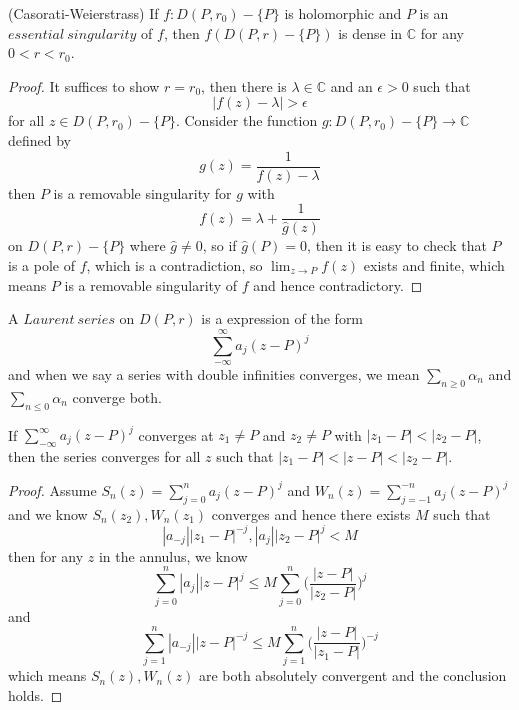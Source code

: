\documentclass[lang=en, color=blue, ]{elegantbook}
\newcommand{\C}{\mathbb{C}}
\begin{document}
\begin{theorem}
    (Casorati-Weierstrass) If  $f:D(P,r_0)-\{P\}$ is holomorphic and $P$ is an $essential\ singularity$ of $f$, then $f(D(P,r)-\{P\})$ is dense in $\C$ for any $0<r<r_0$.
\end{theorem}
\begin{proof}\par
    It suffices to show $r=r_0$, then there is $\lambda \in \C$ and an $\epsilon > 0$ such that
    \[|f(z)-\lambda|>\epsilon\]
    for all $z\in D(P,r_0)-\{P\}$. Consider the function $g:D(P,r_0)-\{P\}\to \C$ defined by
    \[
    g(z) = \dfrac{1}{f(z)-\lambda}
    \]
    then $P$ is a removable singularity for $g$ with
    \[
    f(z) = \lambda + \dfrac{1}{\hat{g}(z)}
    \]
    on $D(P,r)-\{P\}$ where $\hat{g} \neq 0$, so if $\hat{g}(P) = 0$, then it is easy to check that $P$ is a pole of $f$, which is a contradiction, so $\lim_{z\to P}f(z)$ exists and finite, which means $P$ is a removable singularity of $f$ and hence contradictory.
\end{proof}

\begin{definition}
    A $Laurent\ series$ on $D(P,r)$ is a expression of the form
    \[
    \sum\limits_{-\infty}^{\infty}a_j (z-P)^j
    \]
    and when we say a series with double infinities converges, we mean $\sum_{n\geq 0}\alpha_n$ and $\sum_{n\leq 0}\alpha_n$ converge both.
\end{definition}

\begin{lemma}
    If $\sum\limits_{-\infty}^{\infty} a_j(z-P)^j$ converges at $z_1 \neq P$ and $z_2\neq P$ with $|z_1 - P| < |z_2 - P|$, then the series converges for all $z$ such that $|z_1 - P| < |z-P|<|z_2-P|$.
\end{lemma}
\begin{proof}\par
    Assume $S_n(z) = \sum\limits_{j=0}^n a_j(z-P)^j$ and $W_n(z) = \sum\limits_{j=-1}^{-n} a_j(z-P)^j$ and we know $S_n(z_2),W_n(z_1)$ converges and hence there exists $M$ such that
    \[
    |a_{-j}||z_1-P|^{-j}, |a_j||z_2-P|^{j} < M
    \]
    then for any $z$ in the annulus, we know
    \[
    \sum\limits_{j=0}^n |a_j||z-P|^j \leq M\sum\limits_{j=0}^n \Big(\dfrac{|z-P|}{|z_2-P|}\Big)^j
    \]
    and
    \[
    \sum\limits_{j=1}^{n} |a_{-j}||z-P|^{-j} \leq M\sum\limits_{j=1}^{n} \Big(\dfrac{|z-P|}{|z_1-P|}\Big)^{-j}
    \]
    which means $S_n(z),W_n(z)$ are both absolutely convergent and the conclusion holds.
\end{proof}
\end{document}
